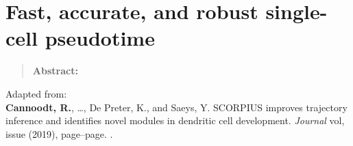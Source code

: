 \newpage{\thispagestyle{empty}\cleardoublepage}
\chapter{Fast, accurate, and robust single-cell pseudotime} 
\label{chap:scorpius}

\begin{quote}
	\textbf{Abstract:} \blindtext
\end{quote}

\vfill

Adapted from:\\
\textbf{Cannoodt, R.}, \ldots, De Preter, K., and Saeys, Y. SCORPIUS improves trajectory inference and identifies novel modules in dendritic cell development. \textit{Journal} vol, issue (2019), page--page. .
\newpage

\blindtext